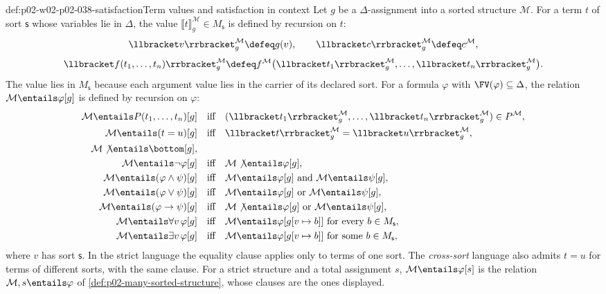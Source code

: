 \begin{hbdefinition}{def:p02-w02-p02-038-satisfaction}{Term values and satisfaction in context}
Let \(g\) be a \(\Delta\)-assignment into a sorted structure \(\mathcal M\).
For a term \(t\) of sort \(\mathsf s\) whose variables lie in \(\Delta\), the
value \(\llbracket t\rrbracket^{\mathcal M}_{g}\in M_{\mathsf s}\) is defined
by recursion on \(t\):
\[
 \llbracket v\rrbracket^{\mathcal M}_{g}\defeq g(v),\qquad
 \llbracket c\rrbracket^{\mathcal M}_{g}\defeq c^{\mathcal M},
\]
\[
 \llbracket f(t_1,\ldots,t_n)\rrbracket^{\mathcal M}_{g}\defeq
 f^{\mathcal M}\bigl(\llbracket t_1\rrbracket^{\mathcal M}_{g},\ldots,
   \llbracket t_n\rrbracket^{\mathcal M}_{g}\bigr).
\]
The value lies in \(M_{\mathsf s}\) because each argument value lies in the
carrier of its declared sort.  For a formula \(\varphi\) with
\(\FV(\varphi)\subseteq\Delta\), the relation
\(\mathcal M\entails\varphi[g]\) is defined by recursion on \(\varphi\):
\[
\begin{aligned}
 \mathcal M\entails P(t_1,\ldots,t_n)[g]
 &\quad\text{iff}\quad
 (\llbracket t_1\rrbracket^{\mathcal M}_{g},\ldots,
   \llbracket t_n\rrbracket^{\mathcal M}_{g})\in P^{\mathcal M},\\
 \mathcal M\entails (t=u)[g]
 &\quad\text{iff}\quad
 \llbracket t\rrbracket^{\mathcal M}_{g}=\llbracket u\rrbracket^{\mathcal M}_{g},\\
 \mathcal M\not\entails\bottom[g],&\\
 \mathcal M\entails\neg\varphi[g]
 &\quad\text{iff}\quad \mathcal M\not\entails\varphi[g],\\
 \mathcal M\entails(\varphi\land\psi)[g]
 &\quad\text{iff}\quad
 \mathcal M\entails\varphi[g]\text{ and }\mathcal M\entails\psi[g],\\
 \mathcal M\entails(\varphi\lor\psi)[g]
 &\quad\text{iff}\quad
 \mathcal M\entails\varphi[g]\text{ or }\mathcal M\entails\psi[g],\\
 \mathcal M\entails(\varphi\to\psi)[g]
 &\quad\text{iff}\quad
 \mathcal M\not\entails\varphi[g]\text{ or }\mathcal M\entails\psi[g],\\
 \mathcal M\entails\forall v\,\varphi[g]
 &\quad\text{iff}\quad
 \mathcal M\entails\varphi[g[v\mapsto b]]\text{ for every }b\in M_{\mathsf s},\\
 \mathcal M\entails\exists v\,\varphi[g]
 &\quad\text{iff}\quad
 \mathcal M\entails\varphi[g[v\mapsto b]]\text{ for some }b\in M_{\mathsf s},
\end{aligned}
\]
where \(v\) has sort \(\mathsf s\).  In the strict language the equality
clause applies only to terms of one sort.  The \emph{cross-sort} language
also admits \(t=u\) for terms of different sorts, with the same clause.  For
a strict structure and a total assignment \(s\), \(\mathcal M\entails\varphi[s]\)
is the relation \(\mathcal M,s\entails\varphi\) of
\cref{def:p02-many-sorted-structure}, whose clauses are the ones displayed.
\end{hbdefinition}

